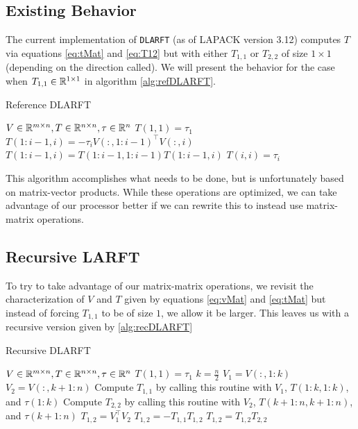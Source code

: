 \documentclass[12pt]{article}
\begin{document}
    \subsection{Existing Behavior}
    The current implementation of \verb|DLARFT| (as of LAPACK version 3.12) computes $T$ via equations 
    \ref{eq:tMat} and \ref{eq:T12} but with either $T_{1,1}$ or $T_{2,2}$ of size $1\times 1$ (depending on the direction called). We will present the behavior for the case when $T_{1,1}\in\mathbb{R}^{1\times 1}$ in algorithm \ref{alg:refDLARFT}.

    \begin{algorithm}
        \caption{Reference DLARFT}\label{alg:refDLARFT}
        \begin{algorithmic}[1]
            \REQUIRE $V\in\mathbb{R}^{m\times n}, T\in\mathbb{R}^{n\times n}, \tau\in\mathbb{R}^{n}$ \hfill{}
            \STATE $T(1,1) = \tau_1$
                \STATE $T(1:i-1,i) = -\tau_iV(:,1:i-1)^\top V(:,i)$
                \STATE $T(1:i-1,i) = T(1:i-1,1:i-1)T(1:i-1,i)$
                \STATE $T(i,i) = \tau_i$
            \ENDFOR
        \end{algorithmic}
    \end{algorithm}
    This algorithm accomplishes what needs to be done, but is unfortunately based on matrix-vector products.
    While these operations are optimized, we can take advantage of our processor better if we can rewrite this
    to instead use matrix-matrix operations.
    \subsection{Recursive LARFT}
    To try to take advantage of our matrix-matrix operations, we revisit the characterization of $V$ and $T$
    given by equations \ref{eq:vMat} and \ref{eq:tMat} but instead of forcing $T_{1,1}$ to be of size $1$, we 
    allow it be larger. This leaves us with a recursive version given by \ref{alg:recDLARFT}
    
    \begin{algorithm}
        \caption{Recursive DLARFT}\label{alg:recDLARFT}
        \begin{algorithmic}[1]
            \REQUIRE $V\in\mathbb{R}^{m\times n}, T\in\mathbb{R}^{n\times n}, \tau\in\mathbb{R}^n$\hfill{}
                \STATE $T(1,1) = \tau_1$
                \RETURN
            \ENDIF
            \STATE $k = \frac{n}{2}$\hfill{}
            \STATE $V_1 = V(:,1:k)$
            \STATE $V_2 = V(:,k+1:n)$
            \STATE Compute $T_{1,1}$ by calling this routine with $V_1$, $T(1:k,1:k)$, and $\tau(1:k)$
            \STATE Compute $T_{2,2}$ by calling this routine with $V_2$, $T(k+1:n,k+1:n)$, and $\tau(k+1:n)$
            \STATE $T_{1,2} = V_1^\top V_2$
            \STATE $T_{1,2} = -T_{1,1}T_{1,2}$
            \STATE $T_{1,2} = T_{1,2}T_{2,2}$
            \RETURN
        \end{algorithmic}
    \end{algorithm}
\end{document}

